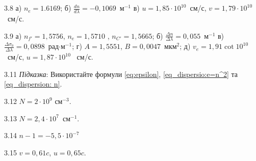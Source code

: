 \protect \section *{}
\begin{Solution}{3.{8}}
	а) $n_e=1.6169$; б) $\frac{d n}{d\lambda} =-0,1069$~м$^{-1}$ в) $u = 1,85\cdot10^{10}$~см/с, $v = 1,79\cdot10^{10}$~см/с.
\end{Solution}
\begin{Solution}{3.{9}}
	а) $n_{f'} = 1,5756$, $n_e = 1,5710$ , $n_{C'} =  1,5665$; б) $\frac{\Delta n}{\Delta\lambda} = 0,055$~м$^{-1}$ в) $\frac{\Delta \sigma_0}{\Delta\lambda} = 0,0898$~рад$\cdot$м$^{-1}$; г) $A = 1,5551$, $B = 0,0047$~мкм$^2$; д) $v_e = 1,91\cot10^{10}$~см/с, $u = 1,87\cdot10^{10}$~ см/с.
\end{Solution}
\begin{Solution}{3.{11}}
	\emph{Підказка}: Використайте формули \eqref{eq:epsilon}, \eqref{eq_dispersio:e=n^2} та \eqref{eq_dispersion: n}.
\end{Solution}
\begin{Solution}{3.{12}}
	$N = 2\cdot10^9$ см$^{-3}$.
\end{Solution}
\begin{Solution}{3.{13}}
	$N = 2,4\cdot10^7$~см$^{-1}$.
\end{Solution}
\begin{Solution}{3.{14}}
	$n - 1 = - 5,5\cdot10^{-7}$
\end{Solution}
\begin{Solution}{3.{15}}
	$v = 0,61c$, $u = 0,65c$.
\end{Solution}
